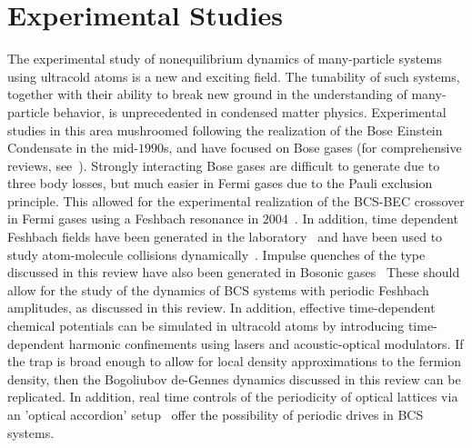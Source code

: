 \documentclass[aps,pra,floats,epsfig,pdflatex]{revtex4}                                                              %
\begin{document}
\section{\sc Experimental Studies}
The experimental study of nonequilibrium dynamics of many-particle systems using ultracold atoms is a new and exciting field. The tunability of such systems, together with their ability to break new ground in the understanding of many-particle behavior, is unprecedented in condensed matter physics. Experimental studies in this area mushroomed following the realization of the Bose Einstein Condensate in the mid-$1990$s, and have focused on Bose gases (for comprehensive reviews, see~\cite{revs}). Strongly interacting Bose gases are difficult to generate due to three body losses, but much easier in Fermi gases due to the Pauli exclusion principle. This allowed for the experimental realization of the BCS-BEC crossover in Fermi gases using a Feshbach resonance in $2004$~\cite{bcsbec:cross}. In addition, time dependent Feshbach fields have been generated in the laboratory~\cite{cornish} and have been used to study atom-molecule collisions dynamically~\cite{bcsbec:coll}. Impulse quenches of the type discussed in 
this review have also been generated in Bosonic gases~\cite{bikashbabu:ref} These should allow for the study of the dynamics of BCS systems with periodic Feshbach amplitudes, as discussed in this review. In addition, effective time-dependent chemical potentials can be simulated in ultracold atoms by introducing time-dependent harmonic confinements using lasers and acoustic-optical modulators. If the trap is broad enough to allow for local density approximations to the fermion density, then the Bogoliubov de-Gennes  dynamics discussed in this review can be replicated. In addition, real time controls of the periodicity of optical lattices via an 'optical accordion' setup~\cite{hrishi} offer the possibility of periodic drives in BCS systems.
\end{document}
